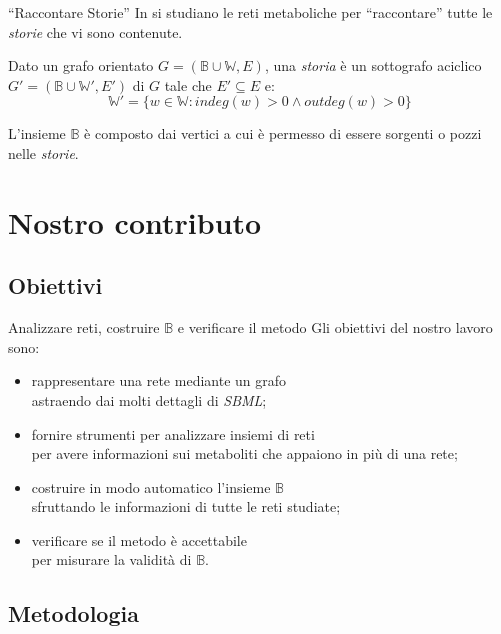 \documentclass{beamer}
\begin{document}
\begin{frame}{``Raccontare Storie''}
In \cite{Crescenzi-Marino} si studiano le reti metaboliche per
``raccontare'' tutte le \emph{storie} che vi sono contenute.
\begin{definition}
  Dato un grafo orientato $G = (\mathbb{B} \cup \mathbb{W}, E)$, una
  \emph{storia} \`e un sottografo aciclico $G' = (\mathbb{B} \cup
  \mathbb{W'}, E')$ di $G$ tale che $E' \subseteq E $ e:
  \begin{displaymath}
    \mathbb{W'} = \{w \in \mathbb{W}: indeg(w) > 0 \wedge outdeg(w)
    > 0\}
  \end{displaymath}
\end{definition}
L'insieme $\mathbb{B}$ \`e composto dai vertici a cui \`e permesso di
essere sorgenti o pozzi nelle \emph{storie}.
\end{frame}

\section{Nostro contributo}

\subsection{Obiettivi}

\begin{frame}{Analizzare reti, costruire $\mathbb{B}$ e verificare il
    metodo}
Gli obiettivi del nostro lavoro sono:
\begin{itemize}
\item<1-> rappresentare una rete mediante un grafo\\
  \footnotesize{astraendo dai molti dettagli di \emph{SBML}};
\item<2-> fornire strumenti per analizzare insiemi di reti\\
  \footnotesize{per avere informazioni sui metaboliti che appaiono in
    pi\`u di una rete};
\item<3-> costruire in modo automatico l'insieme $\mathbb{B}$\\
  \footnotesize{sfruttando le informazioni di tutte le reti studiate};
\item<4-> verificare se il metodo \`e accettabile\\
  \footnotesize{per misurare la validit\`a di $\mathbb{B}$}.
\end{itemize}
\end{frame}

\subsection{Metodologia}
\end{document}
